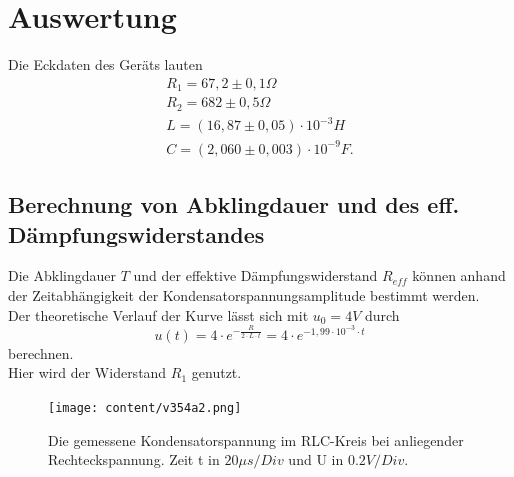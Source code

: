 \section{Auswertung}
\label{sec:Auswertung}

Die Eckdaten des Geräts lauten 
\begin{align*}
  R_1 = 67,2 \pm 0,1 \Omega \\
  R_2 = 682 \pm 0,5 \Omega \\
  L = (16,87 \pm 0,05) \cdot 10^{-3}H \\
  C = (2,060 \pm 0,003) \cdot 10^{-9}F.   %
\end{align*}






\subsection{Berechnung von Abklingdauer und des eff. Dämpfungswiderstandes}
\label{Abklingdauer und R_daempf}

Die Abklingdauer $T$ und der effektive Dämpfungswiderstand $R_{eff}$ können anhand der Zeitabhängigkeit der Kondensatorspannungsamplitude 
bestimmt werden.\\

Der theoretische Verlauf der Kurve lässt sich mit $u_0 = 4V$ durch 
\begin{equation*}
    u(t) = 4 \cdot e^{-\frac{R}{2 \cdot L \cdot t}} = 4 \cdot e^{- 1,99 \cdot 10^{-3} \cdot t}
\end{equation*}
berechnen.\\
Hier wird der Widerstand $R_1$ genutzt. 

\begin{figure}[H]
  \centering
  \texttt{[image: content/v354a2.png]}
  \caption{Die gemessene Kondensatorspannung im RLC-Kreis bei anliegender Rechteckspannung. Zeit t in $20\mu s/Div$ und U in $0.2V/Div$.}
  \label{fig:MessApp}
\end{figure}









